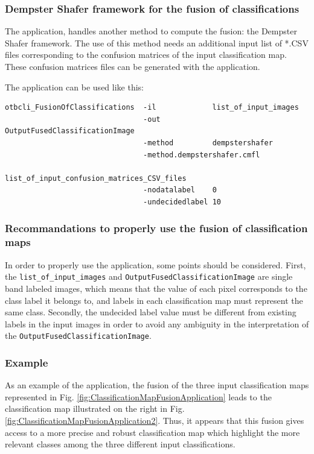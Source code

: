 \subsubsection{Dempster Shafer framework for the fusion of classifications}

The  application, handles another method to 
compute the fusion: the Dempster Shafer framework. The use of this method needs 
an additional input list of *.CSV files corresponding to the confusion matrices of 
the input classification map. These confusion matrices files can be generated with 
the  application.

The application can be used like this:
\begin{verbatim}
otbcli_FusionOfClassifications  -il             list_of_input_images
                                -out            OutputFusedClassificationImage
                                -method         dempstershafer
                                -method.dempstershafer.cmfl 
                                    list_of_input_confusion_matrices_CSV_files
                                -nodatalabel    0
                                -undecidedlabel 10
\end{verbatim}
 

\subsubsection{Recommandations to properly use the fusion of classification maps}

In order to properly use the  application, 
some points should be considered. First, the \verb?list_of_input_images? and 
\verb?OutputFusedClassificationImage? are single band labeled images, which means 
that the value of each pixel corresponds to the class label it belongs to, and 
labels in each classification map must represent the same class. Secondly, the 
undecided label value must be different from existing labels in the input images in 
order to avoid any ambiguity in the interpretation of the \verb?OutputFusedClassificationImage?.



\subsubsection{Example}

As an example of the  application, the fusion of the three input classification maps represented in
Fig. \ref{fig:ClassificationMapFusionApplication} leads to the classification map illustrated on the right in Fig. \ref{fig:ClassificationMapFusionApplication2}.
Thus, it appears that this fusion gives access to a more precise and robust classification map which highlight the more relevant classes among the three different input
classifications.


